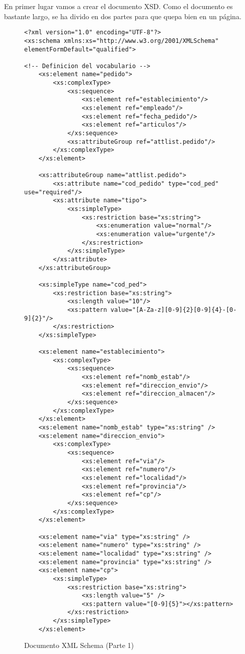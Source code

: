 En primer lugar vamos a crear el documento XSD. Como el documento es bastante largo, se ha divido en dos partes para que quepa bien en un página.


\begin{figure}[H]
    \begin{tcolorbox}[sharp corners, colback=yellow!30, colframe=white!20]
        \scriptsize
        \begin{verbatim}
<?xml version="1.0" encoding="UTF-8"?>
<xs:schema xmlns:xs="http://www.w3.org/2001/XMLSchema" elementFormDefault="qualified">

<!-- Definicion del vocabulario -->
    <xs:element name="pedido">
        <xs:complexType>
            <xs:sequence>
                <xs:element ref="establecimiento"/>
                <xs:element ref="empleado"/>
                <xs:element ref="fecha_pedido"/>
                <xs:element ref="articulos"/>
            </xs:sequence>
            <xs:attributeGroup ref="attlist.pedido"/>
        </xs:complexType>
    </xs:element>

    <xs:attributeGroup name="attlist.pedido">
        <xs:attribute name="cod_pedido" type="cod_ped" use="required"/>
        <xs:attribute name="tipo">
            <xs:simpleType>
                <xs:restriction base="xs:string">
                    <xs:enumeration value="normal"/>
                    <xs:enumeration value="urgente"/>
                </xs:restriction>
            </xs:simpleType>
        </xs:attribute>
    </xs:attributeGroup>

    <xs:simpleType name="cod_ped">
        <xs:restriction base="xs:string">
            <xs:length value="10"/>
            <xs:pattern value="[A-Za-z][0-9]{2}[0-9]{4}-[0-9]{2}"/>
        </xs:restriction>
    </xs:simpleType>

    <xs:element name="establecimiento">
        <xs:complexType>
            <xs:sequence>
                <xs:element ref="nomb_estab"/>
                <xs:element ref="direccion_envio"/>
                <xs:element ref="direccion_almacen"/>
            </xs:sequence>
        </xs:complexType>
    </xs:element>
    <xs:element name="nomb_estab" type="xs:string" />
    <xs:element name="direccion_envio">
        <xs:complexType>
            <xs:sequence>
                <xs:element ref="via"/>
                <xs:element ref="numero"/>
                <xs:element ref="localidad"/>
                <xs:element ref="provincia"/>
                <xs:element ref="cp"/>
            </xs:sequence>
        </xs:complexType>
    </xs:element>

    <xs:element name="via" type="xs:string" />
    <xs:element name="numero" type="xs:string" />
    <xs:element name="localidad" type="xs:string" />
    <xs:element name="provincia" type="xs:string" />
    <xs:element name="cp">
        <xs:simpleType>
            <xs:restriction base="xs:string">
                <xs:length value="5" />
                <xs:pattern value="[0-9]{5}"></xs:pattern>
            </xs:restriction>
        </xs:simpleType>
    </xs:element>
        \end{verbatim}
    \end{tcolorbox}
    \caption{Documento XML Schema (Parte 1)}
\end{figure}

